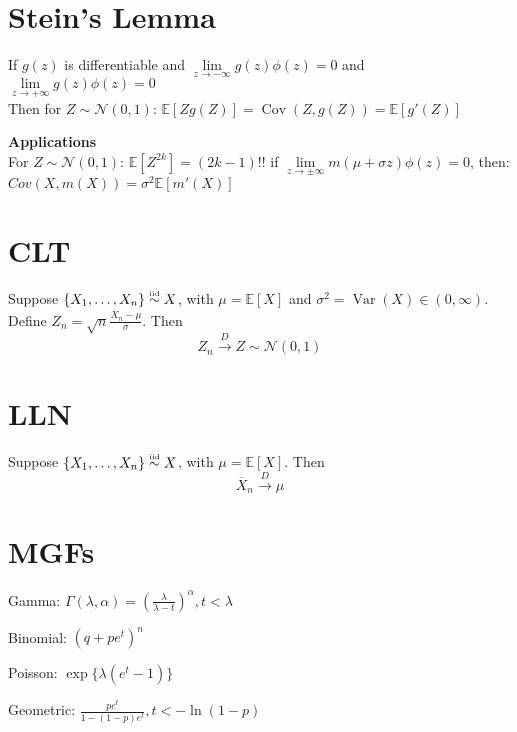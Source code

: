 \documentclass[twocolumn]{amsart}
\newcommand{\E}{\mathbb{E}}
\newcommand{\Cov}{\operatorname{Cov}}
\newcommand{\Var}{\operatorname{Var}}
\newcommand\iid{\mathrel{\overset{\makebox[0pt]{\mbox{\normalfont\tiny iid}}}{\sim}}}
\begin{document}
\section*{Stein's Lemma}
If \(g(z)\) is differentiable and \(\lim\limits_{z\to-\infty} g(z)\phi(z) = 0\) and \(\lim\limits_{z\to+\infty} g(z)\phi(z) = 0\) \\
Then for \(Z\sim\mathcal{N}(0, 1)\): $\E[Z g(Z)] = \Cov(Z, g(Z)) = \E[g'(Z)]$

\textbf{Applications}\\
For \(Z\sim\mathcal{N}(0,1)\): $\E[Z^{2k}] = (2k - 1)!!$
if \(\lim\limits_{z\to\pm\infty} m(\mu + \sigma z)\phi(z)=0\), then: $Cov(X,m(X)) = \sigma^{2}\E[m'(X)]$

\section*{CLT}
Suppose \(\{X_{1},\ldots,X_{n}\} \iid X\), with \(\mu = \E[X]\) and \(\sigma^{2} = \Var(X) \in (0, \infty)\). Define \(Z_{n}=\sqrt{n}\frac{\overline{X}_{n}-\mu}{\sigma}\). Then
\begin{equation*}
  Z_{n} \overset{D}{\longrightarrow} Z\sim\mathcal{N}(0,1)
\end{equation*}

\section*{LLN}
Suppose \(\{X_{1},\ldots,X_{n}\} \iid X\), with \(\mu = \E[X]\). Then
\begin{equation*}
  \overline{X}_{n} \overset{D}{\longrightarrow} \mu
\end{equation*}

\section*{MGFs}
Gamma: $\Gamma(\lambda,\alpha) =
\left(\frac{\lambda}{\lambda-t}\right)^{\alpha}, t < \lambda$

Binomial: $(q+pe^{t})^{n}$

Poisson: $\exp\{\lambda(e^{t} - 1)\}$

Geometric: $\frac{pe^{t}}{1-(1-p)e^{t}}, t<-\ln(1-p)$
\end{document}
